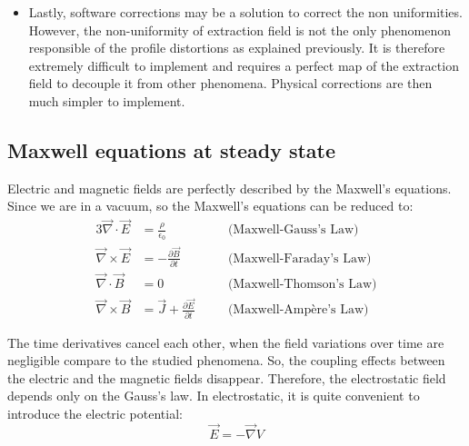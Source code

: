 \begin{refsection}
\begin{itemize}
		\item Lastly, software corrections may be a solution to correct the non uniformities. However, the non-uniformity of extraction field is not the only phenomenon responsible of the profile distortions as explained previously. It is therefore extremely difficult to implement and requires a perfect map of the extraction field to decouple it from other phenomena. Physical corrections are then much simpler to implement.
	\end{itemize}


	\subsection{Maxwell equations at steady state}
	Electric and magnetic fields are perfectly described by the Maxwell's equations. Since we are in a vacuum, so the Maxwell's equations can be reduced to:
	\begin{alignat*}{3}
		\overrightarrow{\nabla} \cdot \overrightarrow{E}  & = \frac{\rho}{\epsilon_{0}}\quad                                           &  & \text{(Maxwell-Gauss's Law)}   \\
		\overrightarrow{\nabla} \times \overrightarrow{E} & = - \frac{\partial \overrightarrow{B}}{\partial t}\quad                    &  & \text{(Maxwell-Faraday's Law)} \\
		\overrightarrow{\nabla} \cdot \overrightarrow{B}  & = 0\quad                                                                   &  & \text{(Maxwell-Thomson's Law)} \\
		\overrightarrow{\nabla} \times \overrightarrow{B} & = \overrightarrow{J} + \frac{\partial \overrightarrow{E}}{\partial t}\quad &  & \text{(Maxwell-Ampère's Law)}
	\end{alignat*}

	The time derivatives cancel each other, when the field variations over time are negligible compare to the studied phenomena. So, the coupling effects between the electric and the magnetic fields disappear. Therefore, the electrostatic field depends only on the Gauss’s law. In electrostatic, it is quite convenient to introduce the electric potential:
	\begin{equation}
		\vec{E} = - \vec{\nabla}V
	\end{equation}


\end{refsection}
